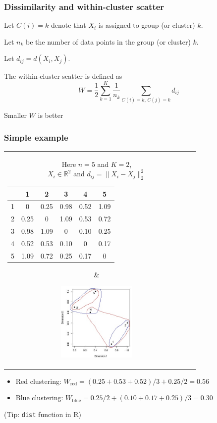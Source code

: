 \documentclass[mathserif]{beamer}
\def\half{\frac{1}{2}}
\def\R{\mathds{R}}
\def\red{\color[rgb]{0.8,0,0}}
\def\blue{\color[rgb]{0,0,0.8}}
\begin{document}
\begin{frame}
\frametitle{Dissimilarity and within-cluster scatter}


Let $C(i)=k$ denote
that $X_i$ is assigned to group (or cluster) $k$. 

Let $n_k$ be the number of data points in the group (or cluster) $k$. 
 
Let $d_{ij}=d(X_i,X_j).$

\pause
\bigskip
The {\blue within-cluster scatter} is defined as 
$$W = \half \sum_{k=1}^K 
\frac{1}{n_k} \sum_{C(i)=k, \, C(j)=k} d_{ij}$$

\bigskip
Smaller $W$ is better
\end{frame}

\begin{frame}
\frametitle{Simple example}
\begin{tabular}{cc}
\parbox{0.5\textwidth}{
\centering
Here $n=5$ and $K=2$,\\
$X_i \in \R^2$ and
$d_{ij}=\|X_i-X_j\|_2^2$

\bigskip
{\footnotesize
\begin{tabular}{|c|c|c|c|c|c|}
\hline
& 1 & 2 & 3 & 4 & 5 \\
\hline
1 & 0 & 0.25 & 0.98 & 0.52 & 1.09 \\
\hline
2 & 0.25 & 0 & 1.09 & 0.53 & 0.72 \\
\hline
3 & 0.98 & 1.09 & 0 & 0.10 & 0.25 \\
\hline
4 & 0.52 & 0.53 & 0.10 & 0 & 0.17 \\
\hline
5 & 1.09 & 0.72 & 0.25 & 0.17 & 0 \\
\hline
\end{tabular}}
} \hspace{5pt} & 
\parbox{0.5\textwidth}{
\includegraphics[width=0.4\textwidth]{figures/simple2.jpg}}
\end{tabular}
\begin{itemize}

\bigskip
\item {\red Red clustering}:
$W_{\text{red}}=(0.25+0.53+0.52)/3 + 0.25/2 = 0.56$
\item {\blue Blue clustering}:
$W_{\text{blue}}=0.25/2 + (0.10+0.17+0.25)/3 = 0.30$
\end{itemize}

\bigskip
(Tip: {\tt dist} function in R)
\end{frame}
\end{document}

